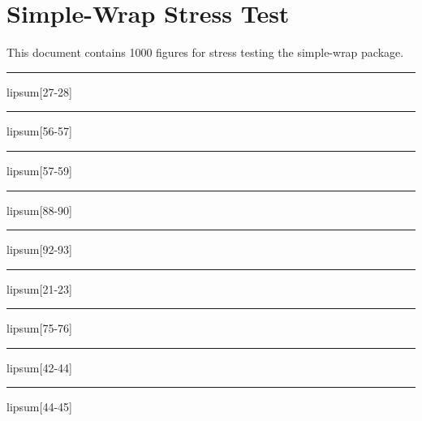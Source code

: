 \documentclass[11pt,a4paper]{article}
\begin{document}
\section*{Simple-Wrap Stress Test}
This document contains 1000 figures for stress testing the simple-wrap package.

\begin{simplewrap}
  \textcolor{orange!11}{\rule{5.2cm}{4.0cm}}
\end{simplewrap}
lipsum[27-28]

\begin{simplewrap}
  \textcolor{magenta!15}{\rule{4.8cm}{2.3cm}}
\end{simplewrap}
lipsum[56-57]

\begin{simplewrap}
  \textcolor{red!45}{\rule{3.6cm}{7.2cm}}
\end{simplewrap}
lipsum[57-59]

\begin{simplewrap}
  \textcolor{teal!10}{\rule{5.3cm}{3.3cm}}
\end{simplewrap}
lipsum[88-90]

\begin{simplewrap}
  \textcolor{yellow!58}{\rule{4.0cm}{2.7cm}}
\end{simplewrap}
lipsum[92-93]

\begin{simplewrap}
  \textcolor{teal!12}{\rule{5.2cm}{6.3cm}}
\end{simplewrap}
lipsum[21-23]

\begin{simplewrap}
  \textcolor{lime!46}{\rule{3.6cm}{2.6cm}}
\end{simplewrap}
lipsum[75-76]

\begin{simplewrap}
  \textcolor{magenta!16}{\rule{4.1cm}{5.6cm}}
\end{simplewrap}
lipsum[42-44]

\begin{simplewrap}
  \textcolor{yellow!52}{\rule{3.8cm}{9.5cm}}
\end{simplewrap}
lipsum[44-45]
\end{document}
